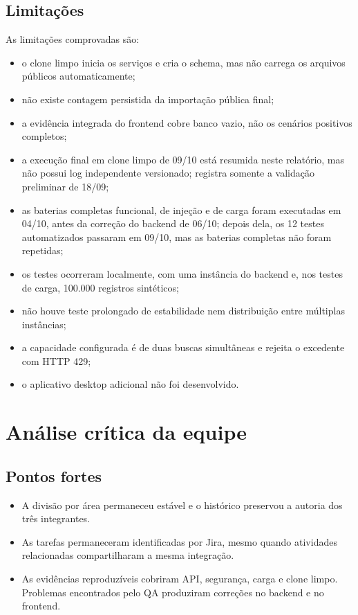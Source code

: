 \documentclass[12pt]{article}
\begin{document}
\subsection{Limitações}\label{sec:limitacoes}

As limitações comprovadas são:

\begin{itemize}
  \item o clone limpo inicia os serviços e cria o schema, mas não carrega os
  arquivos públicos automaticamente;
  \item não existe contagem persistida da importação pública final;
  \item a evidência integrada do frontend cobre banco vazio, não os cenários
  positivos completos;
  \item a execução final em clone limpo de 09/10 está resumida neste relatório,
  mas não possui log independente versionado; 
  registra somente a validação preliminar de 18/09;
  \item as baterias completas funcional, de injeção e de carga foram executadas
  em 04/10, antes da correção do backend de 06/10; depois dela, os 12 testes
  automatizados passaram em 09/10, mas as baterias completas não foram
  repetidas;
  \item os testes ocorreram localmente, com uma instância do backend e, nos
  testes de carga, 100.000 registros sintéticos;
  \item não houve teste prolongado de estabilidade nem distribuição entre
  múltiplas instâncias;
  \item a capacidade configurada é de duas buscas simultâneas e rejeita o
  excedente com HTTP 429;
  \item o aplicativo desktop adicional não foi desenvolvido.
\end{itemize}

\section{Análise crítica da equipe}\label{sec:analise}

\subsection{Pontos fortes}

\begin{itemize}
  \item A divisão por área permaneceu estável e o histórico preservou a autoria
  dos três integrantes.
  \item As tarefas permaneceram identificadas por Jira, mesmo quando atividades
  relacionadas compartilharam a mesma integração.
  \item As evidências reproduzíveis cobriram API, segurança, carga e clone
  limpo. Problemas encontrados pelo QA produziram correções no backend e no
  frontend.
\end{itemize}
\end{document}

